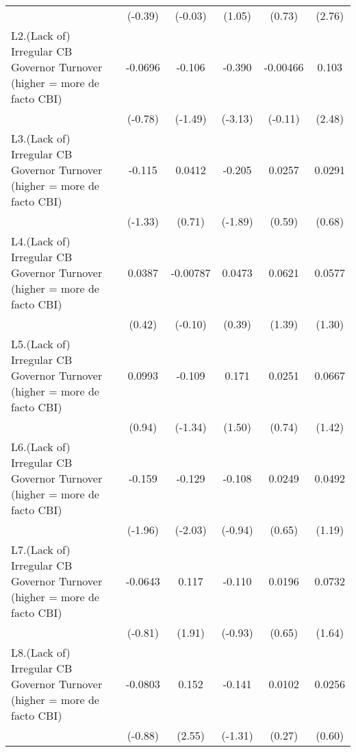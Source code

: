 {\begin{longtable}{l*{5}{c}}
                &  (-0.39)         &  (-0.03)         &   (1.05)         &   (0.73)         &   (2.76)         \\
[1em]
L2.(Lack of) Irregular CB Governor Turnover (higher = more de facto CBI)&  -0.0696         &   -0.106         &   -0.390\sym{**} & -0.00466         &    0.103\sym{*}  \\
                &  (-0.78)         &  (-1.49)         &  (-3.13)         &  (-0.11)         &   (2.48)         \\
[1em]
L3.(Lack of) Irregular CB Governor Turnover (higher = more de facto CBI)&   -0.115         &   0.0412         &   -0.205         &   0.0257         &   0.0291         \\
                &  (-1.33)         &   (0.71)         &  (-1.89)         &   (0.59)         &   (0.68)         \\
[1em]
L4.(Lack of) Irregular CB Governor Turnover (higher = more de facto CBI)&   0.0387         & -0.00787         &   0.0473         &   0.0621         &   0.0577         \\
                &   (0.42)         &  (-0.10)         &   (0.39)         &   (1.39)         &   (1.30)         \\
[1em]
L5.(Lack of) Irregular CB Governor Turnover (higher = more de facto CBI)&   0.0993         &   -0.109         &    0.171         &   0.0251         &   0.0667         \\
                &   (0.94)         &  (-1.34)         &   (1.50)         &   (0.74)         &   (1.42)         \\
[1em]
L6.(Lack of) Irregular CB Governor Turnover (higher = more de facto CBI)&   -0.159         &   -0.129\sym{*}  &   -0.108         &   0.0249         &   0.0492         \\
                &  (-1.96)         &  (-2.03)         &  (-0.94)         &   (0.65)         &   (1.19)         \\
[1em]
L7.(Lack of) Irregular CB Governor Turnover (higher = more de facto CBI)&  -0.0643         &    0.117         &   -0.110         &   0.0196         &   0.0732         \\
                &  (-0.81)         &   (1.91)         &  (-0.93)         &   (0.65)         &   (1.64)         \\
[1em]
L8.(Lack of) Irregular CB Governor Turnover (higher = more de facto CBI)&  -0.0803         &    0.152\sym{*}  &   -0.141         &   0.0102         &   0.0256         \\
                &  (-0.88)         &   (2.55)         &  (-1.31)         &   (0.27)         &   (0.60)         \\

\end{longtable}}
